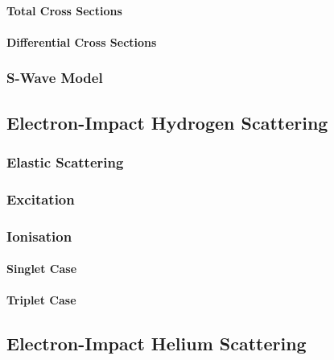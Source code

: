 \documentclass[draft]{article}
\begin{document}
\paragraph{Total Cross Sections}
\label{sec:cc-total-cross-sections}

\paragraph{Differential Cross Sections}
\label{sec:cc-differential-cross-sections}

\subsubsection{S-Wave Model}
\label{sec:s-wave-model}

\subsection{Electron-Impact Hydrogen Scattering}
\label{sec:e-h}

\subsubsection{Elastic Scattering}
\label{sec:e-h-elastic-scattering}

\subsubsection{Excitation}
\label{sec:e-h-excitation}

\subsubsection{Ionisation}
\label{sec:e-h-ionisation}

\paragraph{Singlet Case}
\label{sec:e-h-singlet}

\paragraph{Triplet Case}
\label{sec:e-h-triplet}

\subsection{Electron-Impact Helium Scattering}
\label{sec:e-he}
\end{document}
